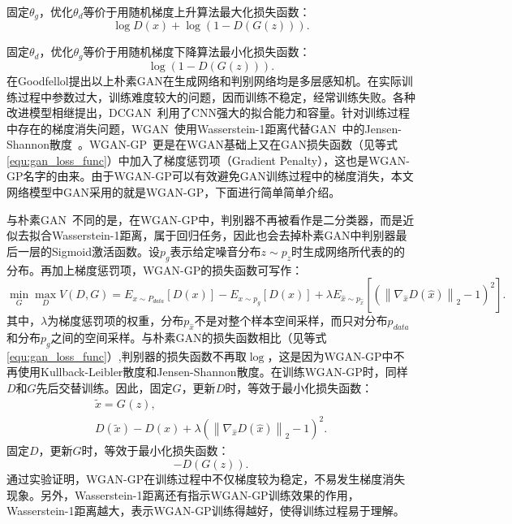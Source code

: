 \noindent 固定$\theta_{g}$，优化$\theta_{d}$等价于用随机梯度上升算法最大化损失函数：
\begin{equation*}
\log D\left(x\right)+\log \left(1-D\left(G\left(z\right)\right)\right).
\end{equation*}

\noindent 固定$\theta_{d}$，优化$\theta_{g}$等价于用随机梯度下降算法最小化损失函数：
\begin{equation*}
\log \left(1-D\left(G\left(z\right)\right)\right).
\end{equation*}
\noindent 在Goodfellol提出以上朴素GAN在生成网络和判别网络均是多层感知机。在实际训练过程中参数过大，训练难度较大的问题，因而训练不稳定，经常训练失败。各种改进模型相继提出，DCGAN~\cite{radford2015unsupervised}利用了CNN强大的拟合能力和容量。针对训练过程中存在的梯度消失问题，WGAN~\cite{gulrajani2017improved}使用Wasserstein-1距离代替GAN~\cite{goodfellow2014generative}中的Jensen-Shannon散度~\cite{arjovsky2017towards}。WGAN-GP~\cite{gulrajani2017improved}更是在WGAN基础上又在GAN损失函数（见等式\ref{equ:gan_loss_func}）中加入了梯度惩罚项（Gradient Penalty），这也是WGAN-GP名字的由来。由于WGAN-GP可以有效避免GAN训练过程中的梯度消失，本文网络模型中GAN采用的就是WGAN-GP，下面进行简单简单介绍。

与朴素GAN~\cite{goodfellow2014generative}不同的是，在WGAN-GP中，判别器不再被看作是二分类器，而是近似去拟合Wasserstein-1距离，属于回归任务，因此也会去掉朴素GAN中判别器最后一层的Sigmoid激活函数。设$p_g$表示给定噪音分布$z\sim p_z$时生成网络所代表的的分布。再加上梯度惩罚项，WGAN-GP的损失函数可写作：
\begin{equation}\label{wgan_gp_loss_func}
\min _{G} \max _{D} V(D, G)=E_{x \sim P_{d a t a}}[D(x)]-E_{x \sim p_{g}}[D(x)]+\lambda E_{\hat{x} \sim p_{\hat{x}}}\left[\left(\left\|\nabla_{\hat{x}} D(\hat{x})\right\|_{2}-1\right)^{2}\right].
\end{equation}
其中，$\lambda$为梯度惩罚项的权重，分布$p_{\hat{x}}$不是对整个样本空间采样，而只对分布$p_{data}$和分布$p_{g}$之间的空间采样。与朴素GAN的损失函数相比（见等式\ref{equ:gan_loss_func}）,判别器的损失函数不再取$\log$，这是因为WGAN-GP中不再使用Kullback-Leibler散度和Jensen-Shannon散度。在训练WGAN-GP时，同样$D$和$G$先后交替训练。因此，固定$G$，更新$D$时，等效于最小化损失函数：
\begin{gather*}
\tilde{{x}} = G_{}({z}), \\
D(\tilde{{x}})-D({x})+\lambda\left(\left\|\nabla_{\hat{x}} D(\hat{x})\right\|_{2}-1\right)^{2}.
\end{gather*}
\noindent 固定$D$，更新$G$时，等效于最小化损失函数：
\begin{equation*}
-D\left(G(z)\right).
\end{equation*}
通过实验证明，WGAN-GP在训练过程中不仅梯度较为稳定，不易发生梯度消失现象。另外，Wasserstein-1距离还有指示WGAN-GP训练效果的作用，Wasserstein-1距离越大，表示WGAN-GP训练得越好，使得训练过程易于理解。
